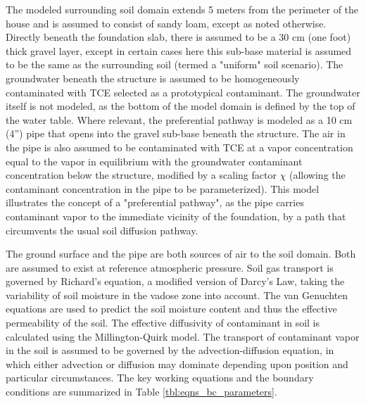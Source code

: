 The modeled surrounding soil domain extends 5 meters from the perimeter of the house and is assumed to consist of sandy loam, except as noted otherwise.
Directly beneath the foundation slab, there is assumed to be a 30 cm (one foot) thick gravel layer, except in certain cases here this sub-base material is assumed to be the same as the surrounding soil (termed a "uniform" soil scenario).
The groundwater beneath the structure is assumed to be homogeneously contaminated with TCE selected as a prototypical contaminant.
The groundwater itself is not modeled, as the bottom of the model domain is defined by the top of the water table.
Where relevant, the preferential pathway is modeled as a 10 cm (4”) pipe that opens into the gravel sub-base beneath the structure.
The air in the pipe is also assumed to be contaminated with TCE at a vapor concentration equal to the vapor in equilibrium with the groundwater contaminant concentration below the structure, modified by a scaling factor $\chi$ (allowing the contaminant concentration in the pipe to be parameterized).
This model illustrates the concept of a "preferential pathway", as the pipe carries contaminant vapor to the immediate vicinity of the foundation, by a path that circumvents the usual soil diffusion pathway.\par

The ground surface and the pipe are both sources of air to the soil domain.
Both are assumed to exist at reference atmospheric pressure.
Soil gas transport is governed by Richard’s equation, a modified version of Darcy’s Law, taking the variability of soil moisture in the vadose zone into account\cite{richards_capillary_1931}.
The van Genuchten equations are used to predict the soil moisture content and thus the effective permeability of the soil\cite{van_genuchten_closed-form_1980}.
The effective diffusivity of contaminant in soil is calculated using the Millington-Quirk model\cite{millington_permeability_1961}.
The transport of contaminant vapor in the soil is assumed to be governed by the advection-diffusion equation, in which either advection or diffusion may dominate depending upon position and particular circumstances.
The key working equations and the boundary conditions are summarized in Table \ref{tbl:eqns_bc_parameters}.\par

